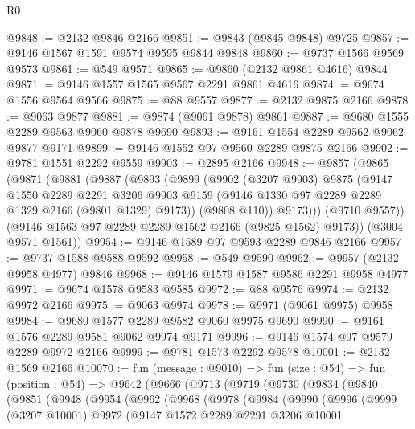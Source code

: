 \begin{lexlean}{R0}
\begin{coremodule}
@9848 := @2132 @9846 @2166
@9851 := @9843 (@9845 @9848) @9725
@9857 := @9146 @1567 @1591 @9574 @9595 @9844 @9848
@9860 := @9737 @1566 @9569 @9573
@9861 := @549 @9571
@9865 := @9860 (@2132 @9861 @4616) @9844
@9871 := @9146 @1557 @1565 @9567 @2291 @9861 @4616
@9874 := @9674 @1556 @9564 @9566
@9875 := @88 @9557
@9877 := @2132 @9875 @2166
@9878 := @9063 @9877
@9881 := @9874 (@9061 @9878) @9861
@9887 := @9680 @1555 @2289 @9563 @9060 @9878 @9690
@9893 := @9161 @1554 @2289 @9562 @9062 @9877 @9171
@9899 := @9146 @1552 @97 @9560 @2289 @9875 @2166
@9902 := @9781 @1551 @2292 @9559
@9903 := @2895 @2166
@9948 := @9857
    (@9865
      (@9871
        (@9881
          (@9887
            (@9893
              (@9899
                (@9902
                  (@3207 @9903)
                  @9875
                  (@9147
                    @1550
                    @2289
                    @2291
                    @3206
                    @9903
                    @9159
                    (@9146 @1330 @97 @2289 @2289 @1329 @2166 (@9801 @1329) @9173))
                  (@9808 @110))
                @9173)))
          (@9710 @9557))
        (@9146 @1563 @97 @2289 @2289 @1562 @2166 (@9825 @1562) @9173))
      (@3004 @9571 @1561))
@9954 := @9146 @1589 @97 @9593 @2289 @9846 @2166
@9957 := @9737 @1588 @9588 @9592
@9958 := @549 @9590
@9962 := @9957 (@2132 @9958 @4977) @9846
@9968 := @9146 @1579 @1587 @9586 @2291 @9958 @4977
@9971 := @9674 @1578 @9583 @9585
@9972 := @88 @9576
@9974 := @2132 @9972 @2166
@9975 := @9063 @9974
@9978 := @9971 (@9061 @9975) @9958
@9984 := @9680 @1577 @2289 @9582 @9060 @9975 @9690
@9990 := @9161 @1576 @2289 @9581 @9062 @9974 @9171
@9996 := @9146 @1574 @97 @9579 @2289 @9972 @2166
@9999 := @9781 @1573 @2292 @9578
@10001 := @2132 @1569 @2166
@10070 := fun (message : @9010) =>
  fun (size : @54) =>
  fun (position : @54) =>
  @9642
    (@9666
      (@9713
        (@9719
          (@9730
            (@9834
              (@9840
                (@9851
                  (@9948
                    (@9954
                      (@9962
                        (@9968
                          (@9978
                            (@9984
                              (@9990
                                (@9996
                                  (@9999
                                    (@3207 @10001)
                                    @9972
                                    (@9147
                                      @1572
                                      @2289
                                      @2291
                                      @3206
                                      @10001

\end{coremodule}
\end{lexlean}
